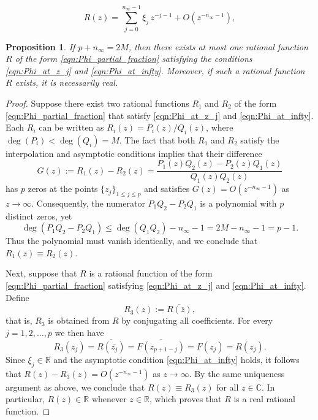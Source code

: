\documentclass[10pt,a4paper]{amsart}
\newtheorem{proposition}{Proposition}
\def\c{{\mathbb C}}
\def\r{{\mathbb R}}
\begin{document}
\begin{equation}\label{eqn:Phi_at_infty}
R(z)=\sum_{j=0}^{n_{\infty}-1} \xi_{j}\, z^{-j-1}+O(z^{-n_{\infty}-1}),
\end{equation}

\begin{proposition}\label{prop_unique}
If $p+n_{\infty}=2M$, then there exists at most one rational function $R$ of the form \eqref{eqn:Phi_partial_fraction} satisfying the conditions \eqref{eqn:Phi_at_z_j} and \eqref{eqn:Phi_at_infty}. Moreover, if such a rational function $R$ exists, it is necessarily real.
\end{proposition}

\begin{proof}
Suppose there exist two rational functions $R_1$ and $R_2$ of the form \eqref{eqn:Phi_partial_fraction} that satisfy \eqref{eqn:Phi_at_z_j} and \eqref{eqn:Phi_at_infty}. Each $R_i$ can be written as $R_i(z)=P_i(z)/Q_i(z)$, where $\deg(P_i)<\deg(Q_i)=M$. The fact that both $R_1$ and $R_2$ satisfy the interpolation and asymptotic conditions implies that their difference
\[
G(z):=R_1(z)-R_2(z) = \frac{P_1(z)Q_2(z)-P_2(z)Q_1(z)}{Q_1(z)Q_2(z)}
\]
has $p$ zeros at the points $\{z_j\}_{1 \le j \le p}$ and satisfies $G(z)=O(z^{-n_{\infty}-1})$ as $z\to\infty$. Consequently, the numerator $P_1Q_2-P_2Q_1$ is a polynomial with $p$ distinct zeros, yet
\[
\deg(P_1Q_2-P_2Q_1) \le \deg(Q_1Q_2)-n_{\infty}-1 = 2M-n_{\infty}-1=p-1.
\]
Thus the polynomial must vanish identically, and we conclude that $R_1(z)\equiv R_2(z)$.  

Next, suppose that $R$ is a rational function of the form \eqref{eqn:Phi_partial_fraction} satisfying \eqref{eqn:Phi_at_z_j} and \eqref{eqn:Phi_at_infty}. Define
\[
R_3(z) := \overline{R(\overline{z})},
\]
that is, $R_3$ is obtained from $R$ by conjugating all coefficients. For every $j=1,2,\dots,p$ we then have
\[
R_3(z_j) = \overline{R(\overline{z_j})}
= \overline{F(z_{p+1-j})} = F(z_j) = R(z_j).
\]
Since $\xi_j\in \r$ and the asymptotic condition \eqref{eqn:Phi_at_infty} holds, it follows that $R(z)-R_3(z)=O(z^{-n_{\infty}-1})$ as $z\to\infty$. By the same uniqueness argument as above, we conclude that $R(z)\equiv R_3(z)$ for all $z\in \c$. In particular, $R(z)\in \r$ whenever $z\in \r$, which proves that $R$ is a real rational function.
\end{proof}
\end{document}
